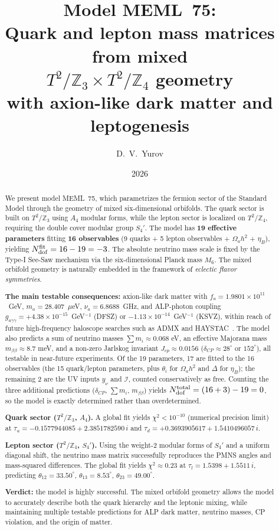 \documentclass[12pt,a4paper]{article}
\title{\textbf{Model MEML~75:}\\[0.3cm]
\large Quark and lepton mass matrices from mixed \\
\(T^2/\mathbb{Z}_3 \times T^2/\mathbb{Z}_4\) geometry \\
with axion-like dark matter and leptogenesis}
\author{D.~V.~Yurov}
\date{2026}
\numberwithin{equation}{section}
\begin{document}
\maketitle

\begin{abstract}
\noindent
We present model MEML~75, which parametrizes the fermion sector of the
Standard Model through the geometry of mixed six-dimensional orbifolds.
The quark sector is built on \(T^2/\mathbb{Z}_3\) using \(A_4\) modular forms,
while the lepton sector is localized on \(T^2/\mathbb{Z}_4\), requiring the
double cover modular group \(S_4'\). The model has \textbf{19 effective parameters}
fitting \textbf{16 observables} (9 quarks + 5 lepton observables + \(\Omega_a h^2\) + \(\eta_B\)),
yielding \(N_{\rm dof}^{\rm fit} = 16 - 19 = -3\). The absolute neutrino mass scale is fixed by the Type-I See-Saw mechanism via the six-dimensional Planck mass \(M_6\). 
The mixed orbifold geometry is naturally embedded in the framework of \emph{eclectic flavor symmetries}.

\textbf{The main testable consequences:}
axion-like dark matter with
\(f_a = 1.9801\times10^{11}\)~GeV,
\(m_a = 28.407\)~\(\mu\)eV, \(\nu_a = 6.8688\)~GHz, and ALP-photon
coupling
\(g_{a\gamma\gamma} = +4.38\times10^{-15}\)~GeV\(^{-1}\) (DFSZ)
or \(-1.13\times10^{-14}\)~GeV\(^{-1}\) (KSVZ), within reach of future
high-frequency haloscope searches such as ADMX and HAYSTAC~\cite{ADMX2018,HAYSTAC2021}.
The model also predicts a sum of neutrino masses \(\sum m_i \approx 0.068\) eV, an effective Majorana mass \(m_{\beta\beta} \approx 8.7\) meV, and a non-zero Jarlskog invariant \(J_{cp} \approx 0.0156\) (\(\delta_{CP} \approx 28^\circ\) or \(152^\circ\)), all testable in near-future experiments.
Of the 19 parameters, 17 are fitted to the 16 observables (the 15 quark/lepton parameters, plus \(\theta_i\) for \(\Omega_a h^2\) and \(\Delta\) for \(\eta_B\)); the remaining 2 are the UV inputs \(y_\nu\) and \(\mathcal{I}\), counted conservatively as free.
Counting the three additional predictions (\(\delta_{CP}\), \(\sum m_i\), \(m_{\beta\beta}\)) yields \(N_{\rm dof}^{\rm total} = (16+3)-19 = 0\), so the model is exactly determined rather than overdetermined.

\textbf{Quark sector (\(T^2/\mathbb{Z}_3\), \(A_4\)).} A global fit yields
\(\chi^2 < 10^{-10}\) (numerical precision limit) at
\(\tau_u = -0.1577944085 + 2.3851782590\,i\) and
\(\tau_d = +0.3693905617 + 1.5410496057\,i\).

\textbf{Lepton sector (\(T^2/\mathbb{Z}_4\), \(S_4'\)).} Using the weight-2 modular forms of \(S_4'\) and a uniform diagonal shift, the neutrino mass matrix successfully reproduces the PMNS angles and mass-squared differences. The global fit yields \(\chi^2 \approx 0.23\) at \(\tau_l = 1.5398 + 1.5511\,i\), predicting \(\theta_{12}=33.50^\circ\), \(\theta_{13}=8.53^\circ\), \(\theta_{23}=49.00^\circ\).

\textbf{Verdict:} the model is highly successful. The mixed orbifold geometry allows the model to accurately describe both the quark hierarchy and the leptonic mixing, while maintaining multiple testable predictions for ALP dark matter, neutrino masses, CP violation, and the origin of matter.
\end{abstract}
\end{document}
